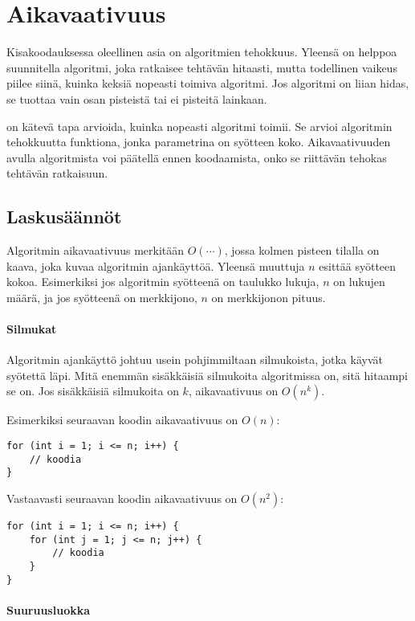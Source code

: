 \chapter{Aikavaativuus}


Kisakoodauksessa oleellinen asia on algoritmien tehokkuus.
Yleensä on helppoa suunnitella algoritmi,
joka ratkaisee tehtävän hitaasti,
mutta todellinen vaikeus piilee siinä,
kuinka keksiä nopeasti toimiva algoritmi.
Jos algoritmi on liian hidas, se tuottaa vain
osan pisteistä tai ei pisteitä lainkaan.

 on kätevä tapa arvioida,
kuinka nopeasti algoritmi toimii.
Se arvioi algoritmin tehokkuutta funktiona,
jonka parametrina on syötteen koko.
Aikavaativuuden avulla algoritmista voi päätellä ennen koodaamista,
onko se riittävän tehokas tehtävän ratkaisuun.

\section{Laskusäännöt}

Algoritmin aikavaativuus merkitään $O(\cdots)$,
jossa kolmen pisteen tilalla
on kaava, joka kuvaa algoritmin ajankäyttöä.
Yleensä muuttuja $n$ esittää syötteen kokoa.
Esimerkiksi jos algoritmin syötteenä on taulukko lukuja,
$n$ on lukujen määrä,
ja jos syötteenä on merkkijono,
$n$ on merkkijonon pituus.

\subsubsection*{Silmukat}

Algoritmin ajankäyttö johtuu usein
pohjimmiltaan silmukoista,
jotka käyvät syötettä läpi.
Mitä enemmän sisäkkäisiä silmukoita
algoritmissa on, sitä hitaampi se on.
Jos sisäkkäisiä silmukoita on $k$,
aikavaativuus on $O(n^k)$.

Esimerkiksi seuraavan koodin aikavaativuus on $O(n)$:
\begin{lstlisting}
for (int i = 1; i <= n; i++) {
    // koodia
}
\end{lstlisting}

Vastaavasti seuraavan koodin aikavaativuus on $O(n^2)$:
\begin{lstlisting}
for (int i = 1; i <= n; i++) {
    for (int j = 1; j <= n; j++) {
        // koodia
    }
}
\end{lstlisting}

\subsubsection*{Suuruusluokka}


